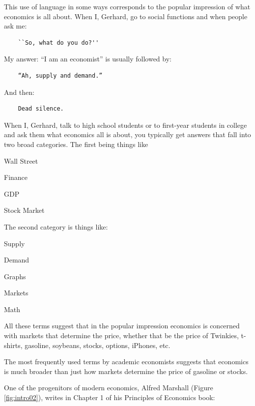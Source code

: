 \documentclass[
]{book}
\begin{document}
This use of language in some ways corresponds to the popular impression of what economics is all about. When I, Gerhard, go to social functions and when people ask me:

\begin{verbatim}
    ``So, what do you do?''
\end{verbatim}

My answer: ``I am an economist'' is usually followed by:

\begin{verbatim}
    “Ah, supply and demand.”
\end{verbatim}

And then:

\begin{verbatim}
    Dead silence.
\end{verbatim}

When I, Gerhard, talk to high school students or to first-year students in college and ask them what economics all is about, you typically get answers that fall into two broad categories. The first being things like

\begin{center}
Wall Street

Finance

GDP

Stock Market

\end{center}

The second category is things like:

\begin{center}
Supply

Demand

Graphs

Markets

Math

\end{center}

All these terms suggest that in the popular impression economics is concerned with markets that determine the price, whether that be the price of Twinkies, t-shirts, gasoline, soybeans, stocks, options, iPhones, etc.

The most frequently used terms by academic economists suggests that economics is much broader than just how markets determine the price of gasoline or stocks.

One of the progenitors of modern economics, Alfred Marshall (Figure \ref{fig:intro02}), writes in Chapter 1 of his Principles of Economics book:
\end{document}
